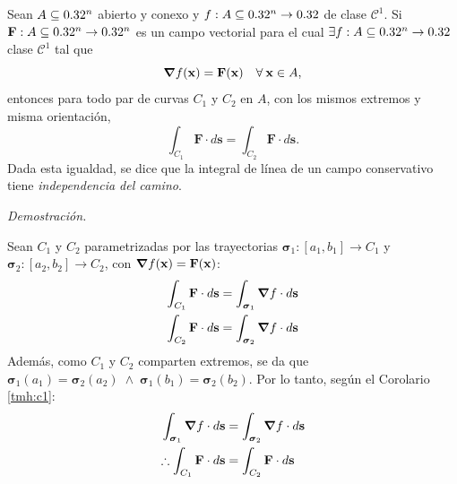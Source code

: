 \begin{corollary}\label{tmh:c2}
    Sean $A\subseteq0.32^n$ abierto y conexo y $f:A\subseteq0.32^n\to0.32$ de clase $\mathcal{C}^1$. Si $\mathbf{F}:A\subseteq0.32^n\to0.32^n$ es un campo vectorial para el cual $\exists f:A\subseteq0.32^n\to0.32$ clase $\mathcal{C}^1$ tal que 
    $$\grad f(\mathbf{x})=\mathbf{F}(\mathbf{x})\quad\forall\:\mathbf{x}\in A,$$
    entonces para todo par de curvas $C_1$ y $C_2$ en $A$, con los mismos extremos y misma orientaci\'on,
    \[
    \int_{C_1}\mathbf{F}\cdot d\mathbf{s}=\int_{C_2}\mathbf{F}\cdot d\mathbf{s}. 
    \]
    Dada esta igualdad, se dice que la integral de línea de un campo conservativo tiene \textit{independencia del camino}.

    \textit{Demostración.} 

    Sean $C_1$ y $C_2$ parametrizadas por las trayectorias $\boldsymbol{\sigma}_1:[a_1,b_1]\to C_1$ y $\boldsymbol{\sigma}_2:[a_2,b_2]\to C_2$, con $\grad f(\mathbf{x})=\mathbf{F}(\mathbf{x})$:
    \begin{align*}
        \int_{C_1}\mathbf{F}\cdot d\mathbf{s}&=\int_{\boldsymbol{\sigma}_1}\grad f\cdot d\mathbf{s}\\
        \int_{C_2}\mathbf{F}\cdot d\mathbf{s}&=\int_{\boldsymbol{\sigma}_2}\grad f\cdot d\mathbf{s}
    \end{align*}
    Además, como $C_1$ y $C_2$ comparten extremos, se da que $\boldsymbol{\sigma}_1(a_1)=\boldsymbol{\sigma}_2(a_2)\;\land\;\boldsymbol{\sigma}_1(b_1)=\boldsymbol{\sigma}_2(b_2)$.
    Por lo tanto, según el Corolario \ref{tmh:c1}:
    \begin{align*}
        \int_{\boldsymbol{\sigma}_1}\grad f\cdot d\mathbf{s}&=\int_{\boldsymbol{\sigma}_2}\grad f\cdot d\mathbf{s}\\
        \therefore \int_{C_1}\mathbf{F}\cdot d\mathbf{s}&=\int_{C_2}\mathbf{F}\cdot d\mathbf{s}
    \end{align*}
\end{corollary}

